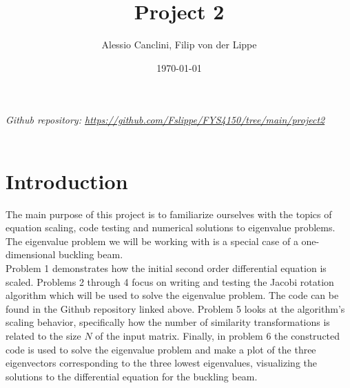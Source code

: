 \documentclass[english,notitlepage]{revtex4-1}  %
\begin{document}
\title{Project 2}
\author{Alessio Canclini, Filip von der Lippe}
\date{\today}
\noaffiliation                            %


\maketitle

\textit{Github repository: \url{https://github.com/Fslippe/FYS4150/tree/main/project2}}
\\
\\
\section*{Introduction}
The main purpose of this project is to familiarize ourselves with the topics
of equation scaling, code testing and numerical solutions to eigenvalue problems.
The eigenvalue problem we will be working with is a special case of a
one-dimensional buckling beam. \\
Problem 1 demonstrates how the initial second order differential equation
is scaled. Problems 2 through 4 focus on writing and testing the Jacobi rotation algorithm which
will be used to solve the eigenvalue problem. The code can be found in the Github repository linked above.
Problem 5 looks at the
algorithm's scaling behavior, specifically how the number of similarity transformations
is related to the size $N$ of the input matrix. Finally, in problem 6 the constructed code is used
to solve the eigenvalue problem and make a plot of the three eigenvectors corresponding to the
three lowest eigenvalues, visualizing the solutions to the differential equation for the buckling beam. \\
\\
\\
\end{document}

